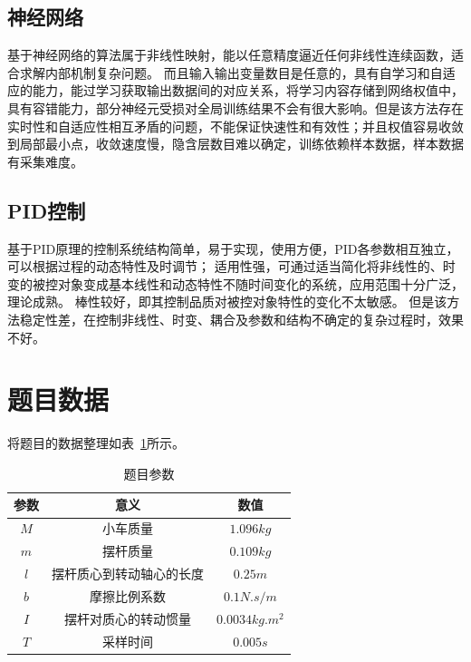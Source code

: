 \subsection{神经网络}
基于神经网络的算法属于非线性映射，能以任意精度逼近任何非线性连续函数，适合求解内部机制复杂问题。
而且输入输出变量数目是任意的，具有自学习和自适应的能力，能过学习获取输出数据间的对应关系，将学习内容存储到网络权值中，具有容错能力，部分神经元受损对全局训练结果不会有很大影响。但是该方法存在实时性和自适应性相互矛盾的问题，不能保证快速性和有效性；并且权值容易收敛到局部最小点，收敛速度慢，隐含层数目难以确定，训练依赖样本数据，样本数据有采集难度。

\subsection{PID控制}
基于PID原理的控制系统结构简单，易于实现，使用方便，PID各参数相互独立，可以根据过程的动态特性及时调节；
适用性强，可通过适当简化将非线性的、时变的被控对象变成基本线性和动态特性不随时间变化的系统，应用范围十分广泛，理论成熟。
棒性较好，即其控制品质对被控对象特性的变化不太敏感。
但是该方法稳定性差，在控制非线性、时变、耦合及参数和结构不确定的复杂过程时，效果不好。

\section{题目数据}

将题目的数据整理如表~\ref{para}所示。

\begin{table}[h]
\centering
\begin{tabular}{ccc}
\hline
参数 & 意义           & 数值                            \\ \hline
$M$  & 小车质量         & $1.096kg$                       \\ \hline
$m$ & 摆杆质量         & $0.109kg$                       \\ \hline
$l$  & 摆杆质心到转动轴心的长度 & $0.25m$                         \\ \hline
$b$  & 摩擦比例系数       & $0.1N.s/m$                      \\ \hline
$I$  & 摆杆对质心的转动惯量   & $0.0034kg.m^2$ \\ \hline
$T$  & 采样时间         & $0.005s$                        \\ \hline
\end{tabular}
\caption{题目参数}\label{para}
\end{table}

